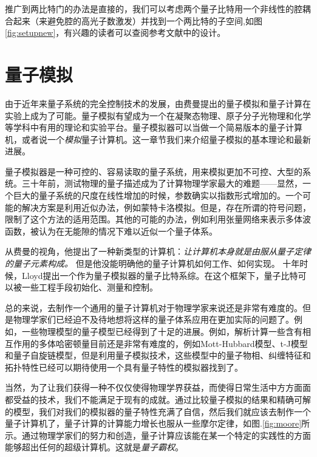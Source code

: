 \documentclass[supercite]{HustGraduPaper}
\begin{document}
 推广到两比特门的办法是直接的，我们可以考虑两个量子比特用一个非线性的腔耦合起来（来避免腔的高光子数激发）并找到一个两比特的子空间,如图\ref{fig:setupnew}，有兴趣的读者可以查阅参考文献\cite{hong2018implementing}中的设计。

   \newpage
   \section{量子模拟}
   由于近年来量子系统的完全控制技术的发展\cite{song201710}，由费曼提出的量子模拟和量子计算在实验上成为了可能。量子模拟有望成为一个在凝聚态物理、原子分子光物理和化学等学科中有用的理论和实验平台。量子模拟器可以当做一个简易版本的量子计算机，或者说一个\textit{模拟}量子计算机。这一章节我们来介绍量子模拟的基本理论和最新进展\cite{blais2004cavity,you2006superconducting,clarke2008superconducting,Georgescu2014}。
  
  量子模拟器是一种可控的、容易读取的量子系统，用来模拟更加不可控、大型的系统。三十年前，测试物理的量子描述成为了计算物理学家最大的难题——显然，一个巨大的量子系统的尺度在线性增加的时候，参数确实以指数形式增加的。一个可能的解决方案是利用近似办法，例如蒙特卡洛模拟。但是，存在所谓的符号问题，限制了这个方法的适用范围。其他的可能的办法，例如利用张量网络来表示多体波函数，被认为在无能隙的情况下难以近似一个量子体系。
  
  从费曼的视角，他提出了一种新类型的计算机：\textit{让计算机本身就是由服从量子定律的量子元素构成。} \cite{feynman1982simulating}但是他没能明确他的量子计算机如何工作、如何实现。 十年时候，Lloyd提出一个作为量子模拟器的量子比特系综\cite{lloyd1996universal}。在这个框架下，量子比特可以被一些工程手段初始化、测量和控制。
  
  总的来说，去制作一个通用的量子计算机对于物理学家来说还是非常有难度的\cite{harrow2017quantum}。但是物理学家们已经迫不及待地想将这样的量子体系应用在更加实际的问题了。例如，一些物理模型的量子模型已经得到了十足的进展\cite{Georgescu2014}。例如，解析计算一些含有相互作用的多体哈密顿量目前还是非常有难度的，例如Mott-Hubbard模型\cite{inguscio2008ultra}、t-J模型\cite{lee2006doping}和量子自旋链模型\cite{giamarchi2003quantum}，但是利用量子模拟技术，这些模型中的量子物相\cite{sachdev2007quantum}、纠缠特征和拓扑特性\cite{zeng2015quantum}已经可以期待使用一个具有量子特性的模拟器找到了\cite{harrow2017quantum}。
  
  当然，为了让我们获得一种不仅仅使得物理学界获益，而使得日常生活中方方面面都受益的技术，我们不能满足于现有的成就。通过比较量子模拟的结果和精确可解的模型，我们对我们的模拟器的量子特性充满了自信，然后我们就应该去制作一个量子计算机了，量子计算的计算能力增长也服从一些摩尔定律，如图.\ref{fig:moore}所示。通过物理学家们的努力和创造，量子计算应该能在某一个特定的实践性的方面能够超出任何的超级计算机。这就是\textit{量子霸权}\cite{harrow2017quantum}。
  
\end{document}
